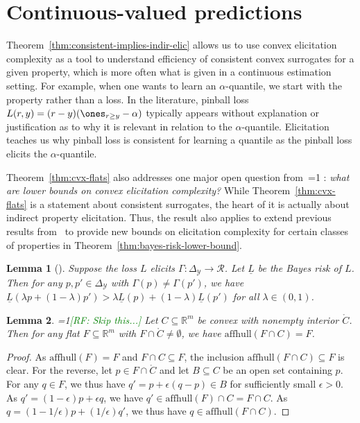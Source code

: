 \documentclass{article}
\newcommand{\Comments}{1}
\newcommand{\mynote}[2]{\ifnum\Comments=1\textcolor{#1}{#2}\fi}
\newcommand{\mytodo}[2]{\ifnum\Comments=1%
	\todo[linecolor=#1!80!black,backgroundcolor=#1,bordercolor=#1!80!black]{#2}\fi}
\newcommand{\raf}[1]{\mynote{green}{[RF: #1]}}
\newcommand{\jessiet}[1]{\mytodo{purple!20!white}{JF: #1}}
\newcommand{\reals}{\mathbb{R}}
\newcommand{\simplex}{\Delta_\Y}
\newcommand{\affhull}{\mathrm{affhull}}
\newcommand{\R}{\mathcal{R}}
\newcommand{\Y}{\mathcal{Y}}
\newtheorem{lemma}{Lemma}
\begin{document}
\section{Continuous-valued predictions}\label{sec:contin-consis}


Theorem~\ref{thm:consistent-implies-indir-elic} allows us to use convex elicitation complexity as a tool to understand efficiency of consistent convex surrogates for a given property, which is more often what is given in a continuous estimation setting.
For example, when one wants to learn an $\alpha$-quantile, we start with the property rather than a loss.
In the literature, pinball loss $L(r,y) = (r-y)(\ones_{r \geq y} - \alpha)$ typically appears without explanation or justification as to why it is relevant in relation to the $\alpha$-quantile.
Elicitation teaches us why pinball loss is consistent for learning a quantile as the pinball loss elicits the $\alpha$-quantile.


Theorem~\ref{thm:cvx-flats} also addresses one major open question from~\cite{frongillo2015elicitation,frongillo2018elicitation}\jessiet{which citation?}: \emph{what are lower bounds on convex elicitation complexity?}
While Theorem~\ref{thm:cvx-flats} is a statement about consistent surrogates, the heart of it is actually about indirect property elicitation.
Thus, the result also applies to extend previous results from~\cite{frongillo2015elicitation,frongillo2018elicitation} to provide new bounds on elicitation complexity for certain classes of properties in Theorem~\ref{thm:bayes-risk-lower-bound}.

\newcommand{\lbar}{\underline{L}} %
\newcommand{\iden}{\mathrm{iden}}
\newcommand{\Var}{\mathrm{Var}}

\begin{lemma}[\cite{frongillo2018elicitation}]
  \label{lem:elic-complex-bayes-concave}
  Suppose the loss $L$ elicits $\Gamma:\simplex\to\R$.
  Let $\lbar$ be the Bayes risk of $L$.
  Then for any $p,p'\in\simplex$ with $\Gamma(p)\neq\Gamma(p')$, we have $\lbar(\lambda p + (1-\lambda) p') > \lambda \lbar(p) + (1-\lambda) \lbar(p')$ for all $\lambda\in(0,1)$.
\end{lemma}

\begin{lemma}\label{lem:affhull-interior}
  \raf{Skip this...}
  Let $C\subseteq\reals^m$ be convex with nonempty interior $\mathring C$.
  Then for any flat $F\subseteq\reals^m$ with $F\cap\mathring C \neq \emptyset$, we have $\affhull(F\cap C) = F$.
\end{lemma}
\begin{proof}
  As $\affhull(F) = F$ and $F\cap C\subseteq F$, the inclusion $\affhull(F\cap C) \subseteq F$ is clear.
  For the reverse, let $p\in F\cap\mathring C$ and let $B\subseteq C$ be an open set containing $p$.
  For any $q\in F$, we thus have $q' = p + \epsilon (q-p) \in B$ for sufficiently small $\epsilon > 0$.
  As $q' = (1-\epsilon) p + \epsilon q$, we have $q' \in \affhull(F)\cap C = F\cap C$.
  As $q = (1-1/\epsilon) p + (1/\epsilon) q'$, we thus have $q\in\affhull(F\cap C)$.
\end{proof}
\end{document}

